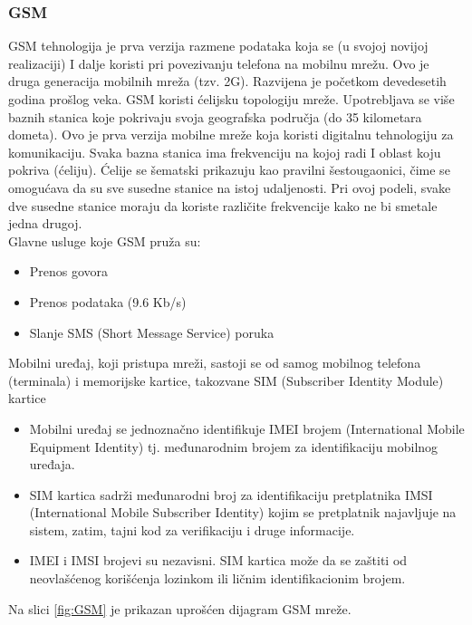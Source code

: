 \documentclass[a4paper]{article}
\begin{document}
{        \subsubsection{GSM}
GSM tehnologija je prva verzija razmene podataka koja se (u svojoj novijoj realizaciji) I dalje koristi pri povezivanju telefona na mobilnu mrežu. Ovo je druga generacija mobilnih mreža (tzv. 2G). Razvijena je početkom devedesetih godina prošlog veka.
GSM koristi ćelijsku topologiju mreže. Upotrebljava se više baznih stanica koje pokrivaju svoja geografska područja (do 35 kilometara dometa). Ovo je prva verzija mobilne mreže koja koristi digitalnu tehnologiju za komunikaciju.
Svaka bazna stanica ima frekvenciju na kojoj radi I oblast koju pokriva (ćeliju). Ćelije se šematski prikazuju kao pravilni šestougaonici, čime se omogućava da su sve susedne stanice na istoj udaljenosti. Pri ovoj podeli, svake dve susedne stanice moraju da koriste različite frekvencije kako ne bi smetale jedna drugoj. \\
Glavne usluge koje GSM pruža su:
\begin{itemize}
    \item Prenos govora
    \item Prenos podataka (9.6 Kb/s)
    \item Slanje SMS (Short Message Service) poruka
\end{itemize}
Mobilni uređaj, koji pristupa mreži,  sastoji se od samog mobilnog telefona (terminala) i memorijske kartice, takozvane SIM (Subscriber Identity Module) kartice
\begin{itemize}
    \item Mobilni uređaj se jednoznačno identifikuje IMEI brojem (International Mobile
Equipment Identity) tj. međunarodnim brojem za identifikaciju mobilnog uređaja.
    \item SIM kartica sadrži međunarodni broj za identifikaciju pretplatnika IMSI
(International Mobile Subscriber Identity) kojim se pretplatnik najavljuje na sistem,
zatim, tajni kod za verifikaciju i druge informacije.
    \item IMEI i IMSI brojevi su nezavisni. SIM kartica može da se zaštiti od neovlašćenog
korišćenja lozinkom ili ličnim identifikacionim brojem.
\end{itemize} 
Na slici \ref{fig:GSM} je prikazan uprošćen dijagram GSM mreže.

}
\end{document}
